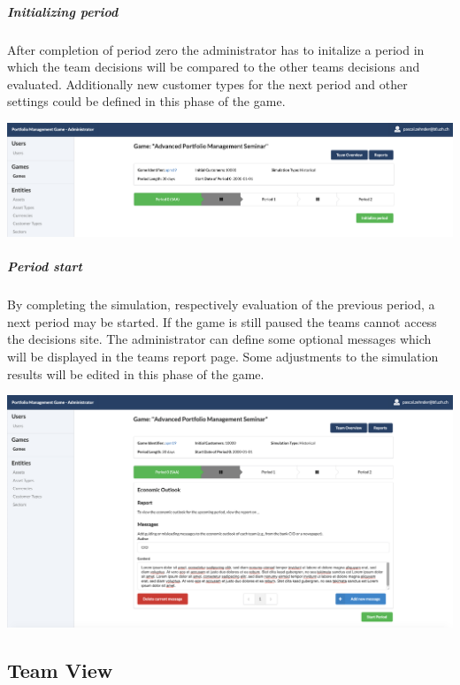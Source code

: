 \subparagraph{Initializing period}
After completion of period zero the administrator has to initalize a period in which the team decisions will be compared to the other teams decisions and evaluated. Additionally new customer types for the next period and other settings could be defined in this phase of the game.
\begin{center}
  \includegraphics[scale=0.2]{img/application-overview/administrator/period_initialization.png}
\end{center}

\subparagraph{Period start}
By completing the simulation, respectively evaluation of the previous period, a next period may be started. If the game is still paused the teams cannot access the decisions site. The administrator can define some optional messages which will be displayed in the teams report page. Some adjustments to the simulation results will be edited in this phase of the game.
\begin{center}
  \includegraphics[scale=0.2]{img/application-overview/administrator/period_start.png}
\end{center}




\subsection{Team View}


